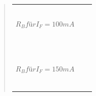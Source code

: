 \begin{quote}
\begin{table}[h]
\begin{addmargin}[-1cm]{3cm}
\begin{tabular}{|p{3cm}|p{3cm}|p{10.2cm}|}
                                 &           &                  \\
                                 &           &                  \\ 
                                 &           &                  \\
                                 &           &                  \\ 
                                 &           &                  \\
         \hline
         $R_{B} für I_{F}=100 mA$ &          &                  \\
                                 &           &                  \\ 
                                 &           &                  \\
                                 &           &                  \\ 
                                 &           &                  \\
                                 &           &                  \\ 
                                 &           &                  \\
                                 &           &                  \\ 
                                 &           &                  \\
                                 &           &                  \\ 
                                 &           &                  \\
                                 &           &                  \\ 
                                 &           &                  \\
         \hline
         $R_{B} für I_{F}=150 mA$ &          &\\
                                 &           &                  \\ 
                                 &           &                  \\
                                 &           &                  \\ 
                                 &           &                  \\
                                 &           &                  \\ 
                                 &           &                  \\

\end{tabular}
\end{addmargin}
\end{table}
\end{quote}
